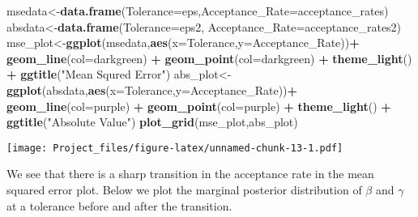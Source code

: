\documentclass[
]{article}
\newenvironment{Shaded}{\begin{snugshade}}{\end{snugshade}}
\newcommand{\AttributeTok}[1]{\textcolor[rgb]{0.13,0.29,0.53}{#1}}
\newcommand{\FunctionTok}[1]{\textcolor[rgb]{0.13,0.29,0.53}{\textbf{#1}}}
\newcommand{\NormalTok}[1]{#1}
\newcommand{\OtherTok}[1]{\textcolor[rgb]{0.56,0.35,0.01}{#1}}
\newcommand{\SpecialCharTok}[1]{\textcolor[rgb]{0.81,0.36,0.00}{\textbf{#1}}}
\newcommand{\StringTok}[1]{\textcolor[rgb]{0.31,0.60,0.02}{#1}}
\begin{document}
\begin{Shaded}
\begin{Highlighting}[]
\NormalTok{msedata}\OtherTok{\textless{}{-}}\FunctionTok{data.frame}\NormalTok{(}\AttributeTok{Tolerance=}\NormalTok{eps,}\AttributeTok{Acceptance\_Rate=}\NormalTok{acceptance\_rates)}
\NormalTok{absdata}\OtherTok{\textless{}{-}}\FunctionTok{data.frame}\NormalTok{(}\AttributeTok{Tolerance=}\NormalTok{eps2, }\AttributeTok{Acceptance\_Rate=}\NormalTok{acceptance\_rates2)}
\NormalTok{mse\_plot}\OtherTok{\textless{}{-}}\FunctionTok{ggplot}\NormalTok{(msedata,}\FunctionTok{aes}\NormalTok{(}\AttributeTok{x=}\NormalTok{Tolerance,}\AttributeTok{y=}\NormalTok{Acceptance\_Rate))}\SpecialCharTok{+}
  \FunctionTok{geom\_line}\NormalTok{(}\AttributeTok{col=}\StringTok{\textquotesingle{}darkgreen\textquotesingle{}}\NormalTok{) }\SpecialCharTok{+} \FunctionTok{geom\_point}\NormalTok{(}\AttributeTok{col=}\StringTok{\textquotesingle{}darkgreen\textquotesingle{}}\NormalTok{) }\SpecialCharTok{+} \FunctionTok{theme\_light}\NormalTok{() }\SpecialCharTok{+} \FunctionTok{ggtitle}\NormalTok{(}\StringTok{"Mean Squred Error"}\NormalTok{)}
\NormalTok{abs\_plot}\OtherTok{\textless{}{-}}\FunctionTok{ggplot}\NormalTok{(absdata,}\FunctionTok{aes}\NormalTok{(}\AttributeTok{x=}\NormalTok{Tolerance,}\AttributeTok{y=}\NormalTok{Acceptance\_Rate))}\SpecialCharTok{+}
  \FunctionTok{geom\_line}\NormalTok{(}\AttributeTok{col=}\StringTok{\textquotesingle{}purple\textquotesingle{}}\NormalTok{) }\SpecialCharTok{+} \FunctionTok{geom\_point}\NormalTok{(}\AttributeTok{col=}\StringTok{\textquotesingle{}purple\textquotesingle{}}\NormalTok{) }\SpecialCharTok{+} \FunctionTok{theme\_light}\NormalTok{() }\SpecialCharTok{+} \FunctionTok{ggtitle}\NormalTok{(}\StringTok{"Absolute Value"}\NormalTok{)}
\FunctionTok{plot\_grid}\NormalTok{(mse\_plot,abs\_plot)}
\end{Highlighting}
\end{Shaded}

\texttt{[image: Project\_files/figure-latex/unnamed-chunk-13-1.pdf]}

We see that there is a sharp transition in the acceptance rate in the
mean squared error plot. Below we plot the marginal posterior
distribution of \(\beta\) and \(\gamma\) at a tolerance before and after
the transition.
\end{document}
